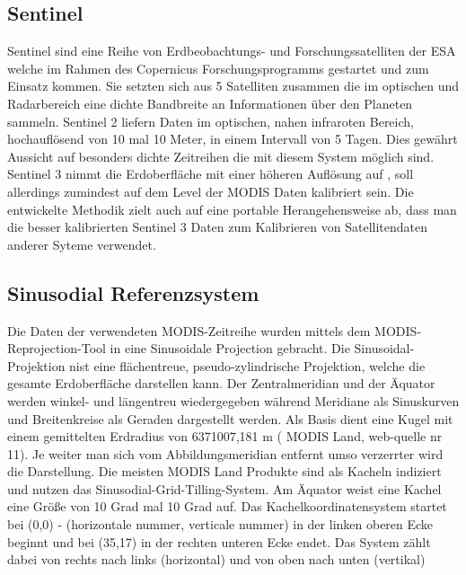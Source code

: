 \documentclass[11pt]{report}
\begin{document}
\subsection{Sentinel}
Sentinel sind eine Reihe von Erdbeobachtungs- und Forschungssatelliten der ESA welche im Rahmen des Copernicus Forschungsprogramms gestartet und zum Einsatz kommen. Sie setzten sich aus 5 Satelliten zusammen die im optischen und Radarbereich eine dichte Bandbreite an Informationen über den Planeten sammeln. Sentinel 2  liefern Daten im optischen, nahen infraroten Bereich, hochauflösend von 10 mal 10 Meter,  in einem Intervall von 5 Tagen. Dies gewährt Aussicht auf besonders dichte Zeitreihen die mit diesem System möglich sind. Sentinel 3  nimmt die Erdoberfläche mit einer höheren Auflösung auf , soll allerdings zumindest auf dem Level der MODIS Daten  kalibriert sein. Die entwickelte Methodik zielt auch auf eine portable Herangehensweise ab, dass man die besser kalibrierten Sentinel 3 Daten zum Kalibrieren von Satellitendaten anderer Syteme  verwendet.


\subsection{Sinusodial Referenzsystem}
Die Daten der verwendeten MODIS-Zeitreihe wurden mittels dem MODIS-Reprojection-Tool in eine Sinusoidale Projection gebracht. Die Sinusoidal-Projektion nist eine flächentreue, pseudo-zylindrische Projektion, welche die gesamte Erdoberfläche darstellen kann. Der Zentralmeridian und der Äquator werden winkel- und längentreu wiedergegeben während Meridiane als Sinuskurven und Breitenkreise als Geraden dargestellt werden. Als Basis dient eine Kugel mit einem gemittelten Erdradius von 6371007,181 m ( MODIS Land, web-quelle nr 11). Je weiter man sich vom Abbildungsmeridian entfernt umso verzerrter wird die Darstellung. Die meisten MODIS Land Produkte sind als Kacheln indiziert und nutzen das Sinusodial-Grid-Tilling-System. Am Äquator weist eine Kachel eine Größe von 10 Grad mal 10 Grad auf. Das Kachelkoordinatensystem startet bei (0,0) - (horizontale nummer, verticale nummer) in der linken oberen Ecke beginnt und bei (35,17) in der rechten unteren Ecke endet. Das System zählt dabei von rechts nach links (horizontal) und von oben nach unten (vertikal)
\end{document}
